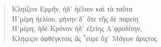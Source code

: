 %
%
%
\begin{quote}
\textgreek{Κληίζειν Ερμῆν, ἠδ᾿ ἠέλιον καὶ τὰ ταῦτα}\\
\textgreek{Η῾μέρη ἠελίου, μήνην δ᾿ ὅτε τῆς δὲ παρείη}\\
\textgreek{Η῾μέρη, ἠδὲ Κρόνον ἠδ᾿ ἑξείης Α᾿φροδίτην},\\
%
\textgreek{Κλήςεςιν ἀφθέγκτοις ἃς ῟ευρε ὄχ᾿ Μάγων ἄριςτος}\\
\end{quote}

